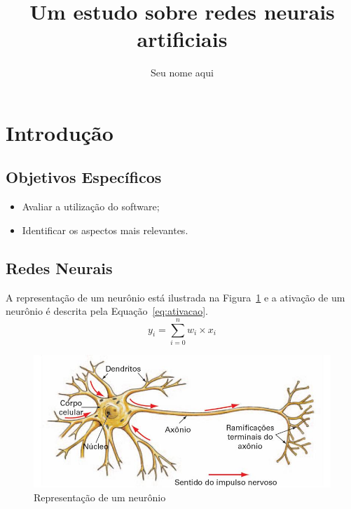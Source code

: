 \documentclass[a4paper, 12pt]{article}
\author{Seu nome aqui}
\title{Um estudo sobre redes neurais artificiais}
\begin{document}
	\maketitle
\section{Introdução}
\subsection{Objetivos Específicos}
\begin{itemize}
	\item Avaliar a utilização do software;
	\item Identificar os aspectos mais relevantes.
\end{itemize}
\subsection{Redes Neurais}
A representação de um neurônio está ilustrada na Figura~\ref{fig:neuronio} e a ativação de um neurônio é descrita pela Equação~\ref{eq:ativacao}.
\begin{equation}
y_i = \sum_{i=0}^{n} w_i \times x_i
\end{equation}\label{eq:ativacao}

\begin{figure}[htb]
	\centering
	\includegraphics[scale=.5]{neuronio}
	\caption{Representação de um neurônio}\label{fig:neuronio}
\end{figure}
\end{document}
